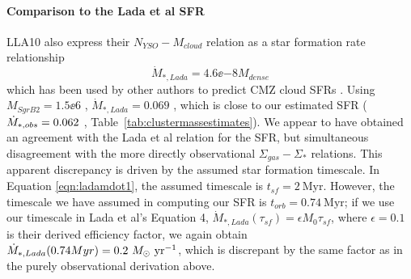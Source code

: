 \documentclass[twocolumn]{aastex61}
\begin{document}
\paragraph{Comparison to the Lada et al SFR}
LLA10 also express their $N_{YSO}-M_{cloud}$ relation as a star
formation rate relationship
\begin{equation}
    \label{eqn:ladamdot1}
    \dot{M}_{*,Lada} = 4.6\ee{-8} M_{dense}
\end{equation}
which has been used by other authors to predict CMZ cloud SFRs
\citep[e.g.,][]{Kauffmann2017c}.
Using
$M_{Sgr B2} = 1.5\ee{6}$ \msun, $\dot{M}_{*,Lada} = 0.069$ \msun \peryr, which
is close to our estimated SFR ($\dot{M}_{*,obs}=0.062$ \msun
\peryr, Table~\ref{tab:clustermassestimates}).  We appear to have
obtained an agreement with the Lada et
al relation for the SFR, but simultaneous disagreement with the more directly
observational $\Sigma_{gas}-\Sigma_*$ relations. This apparent
discrepancy is driven by the assumed star
formation timescale.  In Equation \ref{eqn:ladamdot1}, the assumed timescale
is $t_{sf} = 2\mathrm{~Myr}$.  However, the timescale we have assumed in computing 
our SFR is ${t_{orb} = 0.74 \mathrm{~Myr}}$; if we use our timescale in
Lada et al's Equation
4, $\dot{M}_{*,Lada}(\tau_{sf}) = \epsilon M_0 \tau_{sf}$, where $\epsilon=0.1$
is their derived efficiency factor, we again obtain $\dot{M}_{*,Lada}(0.74 Myr)
= 0.2~M_{\odot}~\textrm{yr}^{-1}$, which is discrepant by the same factor as in the purely
observational derivation above.  

\end{document}
